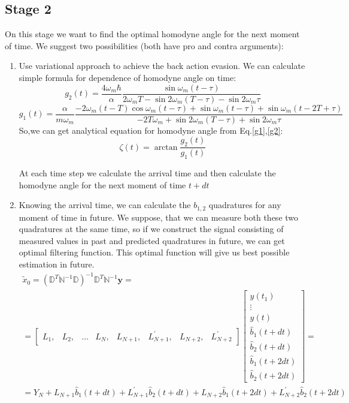 \documentclass[notitlepage,a4paper,11pt,hyperref=pdftex]{revtex4-1}
\begin{document}
\subsection{Stage 2}
On this stage we want to find the optimal homodyne angle for the next moment of time. We suggest two possibilities (both have pro and contra arguments):
\begin{enumerate}
 \item Use variational approach to achieve the back action evasion. We can calculate simple formula for dependence of homodyne angle on time:
\begin{equation}\label{g2}
 g_2(t) = \frac{4\omega_m\hbar}{\alpha} \frac{\sin\omega_m(t-\tau)}{2\omega_mT-\sin2\omega_m(T-\tau)-\sin2\omega_m\tau}
\end{equation}
\begin{equation}\label{g1}
 g_1(t) = \frac{\alpha}{m \omega_m} \frac{-2\omega_m(t-T)\cos\omega_m(t-\tau) + \sin\omega_m(t-\tau) + \sin\omega_m(t-2T+\tau)}{-2T\omega_m + \sin2\omega_m(T-\tau)+\sin2\omega_m\tau}
\end{equation}
So,we can get analytical equation for homodyne angle from Eq.\ref{g1},\ref{g2}:
\begin{equation}\label{appx:zeta}
 \zeta(t) = \arctan\frac{g_2(t)}{g_1(t)}
\end{equation}

At each time step we calculate the arrival time and then calculate the homodyne angle for the next moment of time $t+dt$
\item Knowing the arrival time, we can calculate the $b_{1,2}$ quadratures for any moment of time in future. We suppose, that we can measure both these two quadratures at the same time, so if we construct
the signal consisting of measured values in past and predicted quadratures in future, we can get optimal filtering function. This optimal function will give us best possible estimation in future.
\begin{multline}
 \tilde{x}_0 = (\mathbb{D}^T\mathbb{N}^{-1}\mathbb{D})^{-1}\mathbb{D}^T\mathbb{N}^{-1}\mathbf{y} = \\ =
\begin{bmatrix}
 L_1, & L_2, & \hdots & L_N, & L_{N+1}, & L_{N+1}^{'}, & L_{N+2}, & L_{N+2}^{'}
\end{bmatrix}
\begin{bmatrix}
 y(t_1)\\\vdots\\ y(t) \\ \hat{b}_1(t+dt)\\ \hat{b}_2(t+dt)\\ \hat{b}_1(t+2dt)\\ \hat{b}_2(t+2dt)
\end{bmatrix}
=\\ =Y_N + L_{N+1}\hat{b}_1(t+dt)+L_{N+1}^{'}\hat{b}_2(t+dt)+L_{N+2}\hat{b}_1(t+2dt)+L_{N+2}^{'}\hat{b}_2(t+2dt)
\end{multline}


\end{enumerate}
\end{document}
